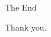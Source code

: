 \documentclass[xcolor={dvipsnames,usenames}]{beamer}
\begin{document}

\begin{frame}{The End}
\begin{center}
	Thank you.
\end{center}
\end{frame}

%
%
\end{document}
